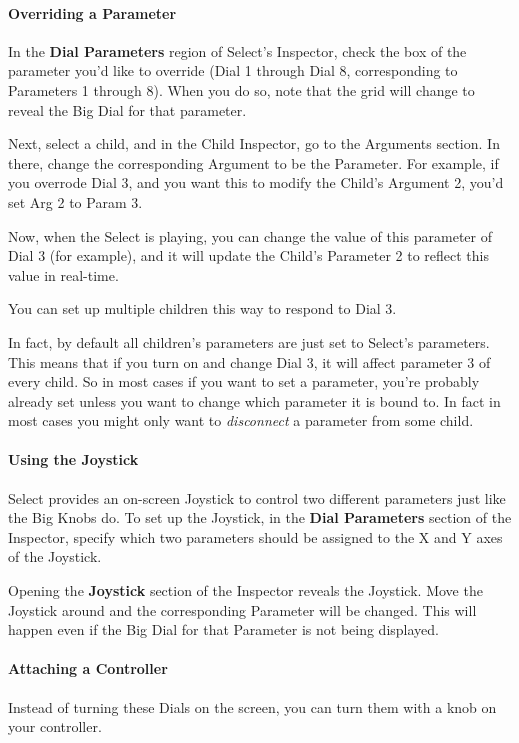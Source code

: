 \documentclass[twoside,10pt]{article}
\begin{document}
\paragraph{Overriding a Parameter}

In the {\bf Dial Parameters} region of Select's Inspector, check the box of the parameter you'd like to override (Dial 1 through Dial 8, corresponding to Parameters 1 through 8).  When you do so, note that the grid will change to reveal the Big Dial for that parameter.

Next, select a child, and in the Child Inspector, go to the Arguments section.  In there, change the corresponding Argument to be the Parameter.  For example, if you overrode Dial 3, and you want this to modify the Child's Argument 2, you'd set Arg 2 to Param 3.  

Now, when the Select is playing, you can change the value of this parameter of Dial 3 (for example), and it will update the Child's Parameter 2 to reflect this value in real-time.

You can set up multiple children this way to respond to Dial 3.

In fact, by default all children's parameters are just set to Select's parameters.  This means that if you turn on and change Dial 3, it will affect parameter 3 of every child.  So in most cases if you want to set a parameter, you're probably already set unless you want to change which parameter it is bound to.  In fact in most cases you might only want to {\it disconnect} a parameter from some child.

\paragraph{Using the Joystick}
Select provides an on-screen Joystick to control two different parameters just like the Big Knobs do.  To set up the Joystick, in the {\bf Dial Parameters} section of the Inspector, specify which two parameters should be assigned to the X and Y axes of the Joystick.

Opening the {\bf Joystick} section of the Inspector reveals the Joystick.  Move the Joystick around and the corresponding Parameter will be changed.  This will happen even if the Big Dial for that Parameter is not being displayed.

\paragraph{Attaching a Controller}
Instead of turning these Dials on the screen, you can turn them with a knob on your controller.  
\end{document}

